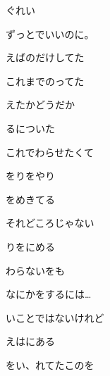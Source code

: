 \documentclass[a4paper,tate,twocolumn,12pt]{ltjtarticle}
\begin{document}
\thispagestyle{empty}

\begin{center}
{\LARGE {}ぐれい}

{\large ずっとでいいのに。}
\end{center}

\vspace{1em}

\begin{flushleft}

\noindent\begin{minipage}{\linewidth}
えばのだけしてた

これまでのってた

えたかどうだか

るについた

これでわらせたくて
\end{minipage}

\vspace{2em}

\noindent\begin{minipage}{\linewidth}

をりをやり

をめきてる


それどころじゃない

りをにめる
\end{minipage}

\vspace{2em}

\noindent\begin{minipage}{\linewidth}

わらないをも

なにかをするには…

いことではないけれど

えはにある
\end{minipage}

\vspace{2em}

\noindent\begin{minipage}{\linewidth}
をい、れてたこのを


\end{minipage}
\end{flushleft}
\end{document}
